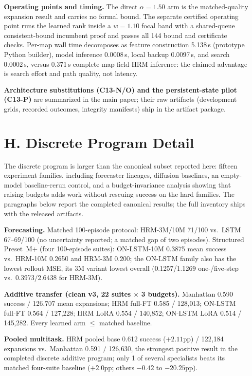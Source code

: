 \documentclass[letterpaper]{article} %
\newcommand{\stage}[1]{\textsc{#1}}
\begin{document}
\textbf{Operating points and timing.} The direct $\alpha{=}1.50$ arm is the matched-quality expansion result and carries no formal bound. The separate certified operating point runs the learned rank inside a $w{=}1.10$ focal band with a shared-queue consistent-bound incumbent proof and passes all 144 bound and certificate checks. Per-map wall time decomposes as feature construction 5.138\,s (prototype Python builder), model inference 0.0008\,s, local backup 0.0097\,s, and search 0.0002\,s, versus 0.371\,s complete-map field-HRM inference: the claimed advantage is search effort and path quality, not latency.

\textbf{Architecture substitutions (\stage{C13-N}/\stage{O}) and the persistent-state pilot (\stage{C13-P})} are summarized in the main paper; their raw artifacts (development grids, recorded outcomes, integrity manifests) ship in the artifact package.

\section{H. Discrete Program Detail}

The discrete program is larger than the canonical subset reported here: fifteen experiment families, including forecaster lineages, diffusion baselines, an empty-model baseline-rerun control, and a budget-invariance analysis showing that raising budgets adds work without rescuing success on the hard families. The paragraphs below report the completed canonical results; the full inventory ships with the released artifacts.

\textbf{Forecasting.} Matched 100-episode protocol: HRM-3M/10M 71/100 vs.\ LSTM 67--69/100 (no uncertainty reported; a matched gap of two episodes). Structured Preset~M+ (four 100-episode suites): ON-LSTM-10M 0.3875 mean success vs.\ HRM-10M 0.2650 and HRM-3M 0.200; the ON-LSTM family also has the lowest rollout MSE, its 3M variant lowest overall (0.1257/1.1269 one-/five-step vs.\ 0.3973/2.6438 for HRM-3M).

\textbf{Additive transfer (clean v3, 22 suites $\times$ 3 budgets).} Manhattan 0.590 success / 126{,}707 mean expansions; HRM full-FT 0.585 / 128{,}013; ON-LSTM full-FT 0.564 / 127{,}228; HRM LoRA 0.554 / 140{,}852; ON-LSTM LoRA 0.514 / 145{,}282. Every learned arm $\leq$ matched baseline.

\textbf{Pooled multitask.} HRM pooled base 0.612 success ($+2.11$pp) / 122{,}184 expansions vs.\ Manhattan 0.591 / 126{,}630, the strongest positive result in the completed discrete additive program; only 1 of several specialists beats its matched four-suite baseline ($+2.0$pp; others $-0.42$ to $-20.25$pp).
\end{document}
